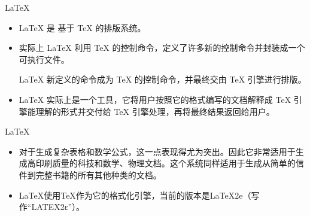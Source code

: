 \documentclass[13pt]{ctexbeamer}
\begin{document}
\begin{frame}{LaTeX}

\begin{itemize}
\item     LaTeX 是 基于 TeX 的排版系统。
    
\item 实际上 LaTeX 利用 TeX 的控制命令，定义了许多新的控制命令并封装成一个可执行文件。
    
 LaTeX 新定义的命令成为 TeX 的控制命令，并最终交由 TeX 引擎进行排版。

\item LaTeX 实际上是一个工具，它将用户按照它的格式编写的文档解释成 TeX 引擎能理解的形式并交付给 TeX 引擎处理，再将最终结果返回给用户。
\end{itemize}

    
    
 
\end{frame}



\begin{frame}{LaTeX}
\begin{itemize}
	\item 对于生成复杂表格和数学公式，这一点表现得尤为突出。因此它非常适用于生成高印刷质量的科技和数学、物理文档。这个系统同样适用于生成从简单的信件到完整书籍的所有其他种类的文档。
	\item LaTeX使用TeX作为它的格式化引擎，当前的版本是LaTeX2e（写作“LATEX2ε”）。
\end{itemize}
\end{frame}
\end{document}
